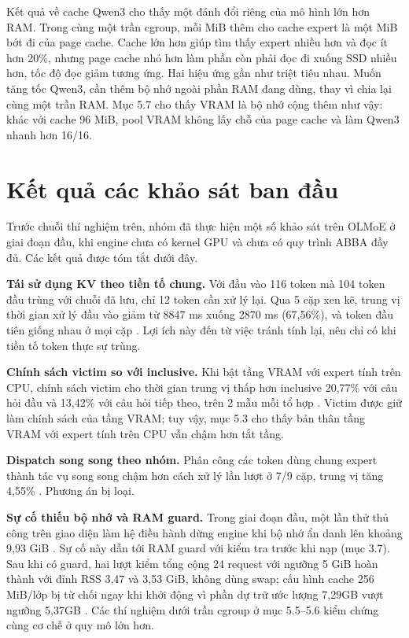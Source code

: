 Kết quả về cache Qwen3 cho thấy một đánh đổi riêng của mô hình lớn hơn RAM. Trong cùng một trần cgroup, mỗi MiB thêm cho cache expert là một MiB bớt đi của page cache. Cache lớn hơn giúp tìm thấy expert nhiều hơn và đọc ít hơn 20\%, nhưng page cache nhỏ hơn làm phần còn phải đọc đi xuống SSD nhiều hơn, tốc độ đọc giảm tương ứng. Hai hiệu ứng gần như triệt tiêu nhau. Muốn tăng tốc Qwen3, cần thêm bộ nhớ ngoài phần RAM đang dùng, thay vì chia lại cùng một trần RAM. Mục 5.7 cho thấy VRAM là bộ nhớ cộng thêm như vậy: khác với cache 96 MiB, pool VRAM không lấy chỗ của page cache và làm Qwen3 nhanh hơn 16/16.

\section{Kết quả các khảo sát ban đầu}

Trước chuỗi thí nghiệm trên, nhóm đã thực hiện một số khảo sát trên OLMoE ở giai đoạn đầu, khi engine chưa có kernel GPU và chưa có quy trình ABBA đầy đủ. Các kết quả được tóm tắt dưới đây.

\textbf{Tái sử dụng KV theo tiền tố chung.} Với đầu vào 116 token mà 104 token đầu trùng với chuỗi đã lưu, chỉ 12 token cần xử lý lại. Qua 5 cặp xen kẽ, trung vị thời gian xử lý đầu vào giảm từ 8847 ms xuống 2870 ms (67,56\%), và token đầu tiên giống nhau ở mọi cặp \cite{exp_prefill_i5}. Lợi ích này đến từ việc tránh tính lại, nên chỉ có khi tiền tố token thực sự trùng.

\textbf{Chính sách victim so với inclusive.} Khi bật tầng VRAM với expert tính trên CPU, chính sách victim cho thời gian trung vị thấp hơn inclusive 20,77\% với câu hỏi đầu và 13,42\% với câu hỏi tiếp theo, trên 2 mẫu mỗi tổ hợp \cite{exp_web_session_i5}. Victim được giữ làm chính sách của tầng VRAM; tuy vậy, mục 5.3 cho thấy bản thân tầng VRAM với expert tính trên CPU vẫn chậm hơn tắt tầng.

\textbf{Dispatch song song theo nhóm.} Phân công các token dùng chung expert thành tác vụ song song chậm hơn cách xử lý lần lượt ở 7/9 cặp, trung vị tăng 4,55\% \cite{exp_prefill_i5}. Phương án bị loại.

\textbf{Sự cố thiếu bộ nhớ và RAM guard.} Trong giai đoạn đầu, một lần thử thủ công trên giao diện làm hệ điều hành dừng engine khi bộ nhớ ẩn danh lên khoảng 9,93 GiB \cite{oom_log_i5}. Sự cố này dẫn tới RAM guard với kiểm tra trước khi nạp (mục 3.7). Sau khi có guard, hai lượt kiểm tổng cộng 24 request với ngưỡng 5 GiB hoàn thành với đỉnh RSS 3,47 và 3,53 GiB, không dùng swap; cấu hình cache 256 MiB/lớp bị từ chối ngay khi khởi động vì phần dự trữ ước lượng 7,29GB vượt ngưỡng 5,37GB \cite{exp_ram_guard_i5}. Các thí nghiệm dưới trần cgroup ở mục 5.5--5.6 kiểm chứng cùng cơ chế ở quy mô lớn hơn.

